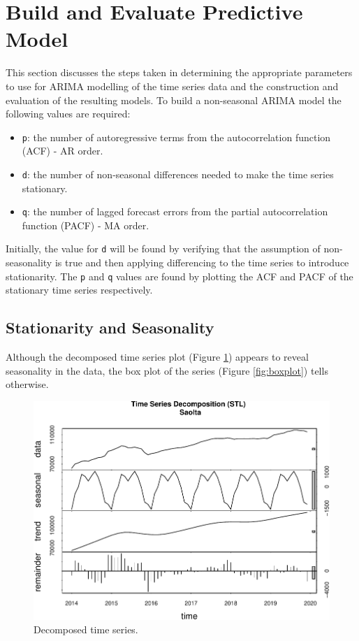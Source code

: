 \documentclass[
  12pt,
]{article}
\begin{document}
\hypertarget{build-and-evaluate-predictive-model}{%
\section{Build and Evaluate Predictive Model}\label{build-and-evaluate-predictive-model}}

\label{sec:build-eval}
This section discusses the steps taken in determining the appropriate parameters to use for ARIMA modelling of the time series data and the construction and evaluation of the resulting models. To build a non-seasonal ARIMA model the following values are required:

\begin{itemize}
\item
  \texttt{p}: the number of autoregressive terms from the autocorrelation function (ACF) - AR order.
\item
  \texttt{d}: the number of non-seasonal differences needed to make the time series stationary.
\item
  \texttt{q}: the number of lagged forecast errors from the partial autocorrelation function (PACF) - MA order.
\end{itemize}

Initially, the value for \texttt{d} will be found by verifying that the assumption of non-seasonality is true and then applying differencing to the time series to introduce stationarity. The \texttt{p} and \texttt{q} values are found by plotting the ACF and PACF of the stationary time series respectively.

\hypertarget{stationarity-and-seasonality}{%
\subsection{Stationarity and Seasonality}\label{stationarity-and-seasonality}}

Although the decomposed time series plot (Figure \ref{fig:decomposed-ts}) appears to reveal seasonality in the data, the box plot of the series (Figure \ref{fig:boxplot}) tells otherwise.

\begin{figure}

{\centering \includegraphics[width=0.8\linewidth]{data_science_ca4_files/figure-latex/decomposed-ts-1} 

}

\caption{Decomposed time series.}\label{fig:decomposed-ts}
\end{figure}
\end{document}
